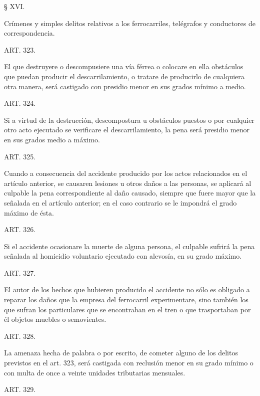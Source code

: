     § XVI.

Crímenes y simples delitos relativos a los ferrocarriles, telégrafos y conductores de correspondencia.





    ART. 323.

    El que destruyere o descompusiere una vía férrea o colocare en ella obstáculos que puedan producir el descarrilamiento, o tratare de producirlo de cualquiera otra manera, será castigado con presidio menor en sus grados mínimo a medio.


    ART. 324.

    Si a virtud de la destrucción, descompostura u obstáculos puestos o por cualquier otro acto ejecutado se verificare el descarrilamiento, la pena será presidio menor en sus grados medio a máximo.


    ART. 325.

    Cuando a consecuencia del accidente producido por los actos relacionados en el artículo anterior, se causaren lesiones u otros daños a las personas, se aplicará al culpable la pena correspondiente al daño causado, siempre que fuere mayor que la señalada en el artículo anterior; en el caso contrario se le impondrá el grado máximo de ésta.



    ART. 326.

    Si el accidente ocasionare la muerte de alguna persona, el culpable sufrirá la pena señalada al homicidio voluntario ejecutado con alevosía, en su grado máximo.



    ART. 327.

    El autor de los hechos que hubieren producido el accidente no sólo es obligado a reparar los daños que la empresa del ferrocarril experimentare, sino también los que sufran los particulares que se encontraban en el tren o que trasportaban por él objetos muebles o semovientes.



    ART. 328.

    La amenaza hecha de palabra o por escrito, de cometer alguno de los delitos previstos en el art. 323, será castigada con reclusión menor en su grado mínimo o con multa de once a veinte unidades tributarias mensuales.








    ART. 329.

